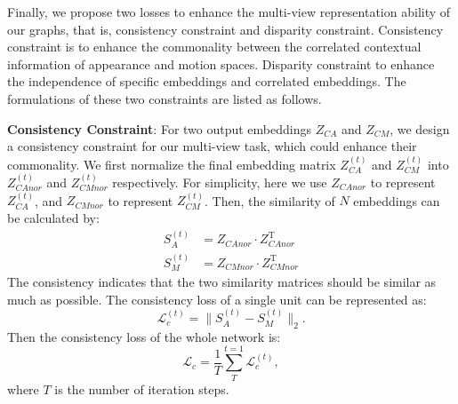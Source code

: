 \documentclass[journal]{IEEEtran}
\begin{document}
Finally, we propose two losses to enhance the multi-view representation ability of our graphs, that is, consistency constraint and disparity constraint. Consistency constraint is to enhance the commonality between the correlated contextual information of appearance and motion spaces. Disparity constraint to enhance the independence of specific embeddings and correlated embeddings. The formulations of these two constraints are listed as follows.

\textbf{Consistency Constraint}:
For two output embeddings $Z_{CA}$ and $Z_{CM}$, we design a consistency constraint for our multi-view task, which could enhance their commonality. We first normalize the final embedding matrix $Z_{CA}^{\left(t\right)}$ and $Z_{CM}^{\left(t\right)}$ into $Z_{CAnor}^{\left(t\right)}$ and $Z_{CMnor}^{\left(t\right)}$ respectively. For simplicity, here we use $Z_{CAnor}$ to represent $Z_{CA}^{\left(t\right)}$, and $Z_{CMnor}$ to represent $Z_{CM}^{\left(t\right)}$.
Then, the similarity of $N$ embeddings can be calculated by:
\begin{equation}
    \begin{aligned}
    S_A^{\left(t\right)} & = Z_{CAnor} \cdot Z_{CAnor}^{\mathrm{T}} \\
    S_M^{\left(t\right)} & = Z_{CMnor} \cdot Z_{CMnor}^{\mathrm{T}}
    \end{aligned}
\end{equation}
The consistency indicates that the two similarity matrices should be similar as much as possible. The consistency loss of a single unit can be represented as:
\begin{equation}
    \mathcal{L}_c^{\left(t\right)} = \parallel S_A^{\left(t\right)} - S_M^{\left(t\right)} \parallel_2.
\end{equation}
Then the consistency loss of the whole network is:
\begin{equation}
    \mathcal{L}_c = \frac{1}{T} \sum^{t=1}_{T}{\mathcal{L}_c^{\left(t\right)}}, \label{eq:consistency}
\end{equation}
where $T$ is the number of iteration steps.
\end{document}
